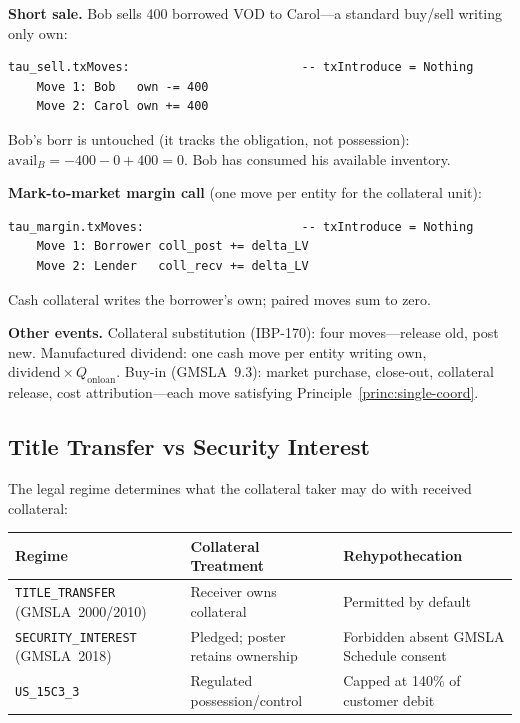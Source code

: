 \noindent\textbf{Short sale.} Bob sells 400 borrowed VOD to Carol---a standard buy/sell writing only $\mathrm{own}$:
\begin{lstlisting}
tau_sell.txMoves:                        -- txIntroduce = Nothing
    Move 1: Bob   own -= 400
    Move 2: Carol own += 400
\end{lstlisting}
Bob's $\mathrm{borr}$ is untouched (it tracks the obligation, not possession): $\mathrm{avail}_B = -400-0+400 = 0$. Bob has consumed his available inventory.

\noindent\textbf{Mark-to-market margin call} (one move per entity for the collateral unit):
\begin{lstlisting}
tau_margin.txMoves:                      -- txIntroduce = Nothing
    Move 1: Borrower coll_post += delta_LV
    Move 2: Lender   coll_recv += delta_LV
\end{lstlisting}
Cash collateral writes the borrower's $\mathrm{own}$; paired moves sum to zero.

\noindent\textbf{Other events.} Collateral substitution (IBP-170): four moves---release old, post new. Manufactured dividend: one cash move per entity writing $\mathrm{own}$, $\text{dividend}\times Q_{\mathrm{onloan}}$. Buy-in (GMSLA~9.3): market purchase, close-out, collateral release, cost attribution---each move satisfying Principle~\ref{princ:single-coord}.

\subsection{Title Transfer vs Security Interest}
\label{sec:sbl-title-transfer}

The legal regime determines what the collateral taker may do with received collateral:

\begin{center}
\small
\begin{tabular}{l p{4.2cm} p{4.2cm}}
\toprule
\textbf{Regime} & \textbf{Collateral Treatment} & \textbf{Rehypothecation} \\
\midrule
\texttt{TITLE\_TRANSFER} (GMSLA~2000/2010) & Receiver owns collateral & Permitted by default \\
\texttt{SECURITY\_INTEREST} (GMSLA~2018) & Pledged; poster retains ownership & Forbidden absent GMSLA Schedule consent \\
\texttt{US\_15C3\_3} & Regulated possession/control & Capped at 140\% of customer debit \\
\bottomrule
\end{tabular}
\end{center}

